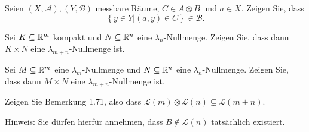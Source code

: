 \begin{Problem}
	\begin{parts}
		\item Seien $(X,\mathcal{A}), (Y,\mathcal{B})$ messbare R\"{a}ume, $C\in A\otimes B$ und $a\in X$. Zeigen Sie, dass
			\[
			\left\{ y\in Y|(a,y)\in C \right\} \in \mathcal{B}
			.\] 
		\item Sei $K\subseteq \mathbb{R}^m$ kompakt und $N\subseteq \mathbb{R}^n$ eine $\lambda_n$-Nullmenge. Zeigen Sie, dass dann $K\times N$ eine $\lambda_{m+n}$-Nullmenge ist.
		\item Sei $M\subseteq \mathbb{R}^m$ eine $\lambda_m$-Nullmenge und $N\subseteq \mathbb{R}^n$ eine $\lambda_n$-Nullmenge. Zeigen Sie, dass dann $M \times N$ eine $\lambda_{m+n}$-Nullmenge ist.
		\item Zeigen Sie Bemerkung 1.71, also dass $\mathcal{L}(m)\otimes \mathcal{L}(n)\subsetneq \mathcal{L}(m+n)$.

			{\footnotesize Hinweis: Sie dürfen hierfür annehmen, dass $B\not\in \mathcal{L}(n)$ tatsächlich existiert.}
	\end{parts}
\end{Problem}
